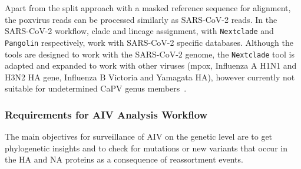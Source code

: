 Apart from the split approach with a masked reference sequence for alignment, the poxvirus reads can be processed similarly as \ac{SARS-CoV-2} reads. In the \ac{SARS-CoV-2} workflow, clade and lineage assignment, with \texttt{Nextclade} and \texttt{Pangolin} respectively, work with \ac{SARS-CoV-2} specific databases. Although the tools are designed to work with the \ac{SARS-CoV-2} genome, the \texttt{Nextclade} tool is adapted and expanded to work with other viruses (mpox, Influenza A H1N1 and H3N2 HA gene, Influenza B Victoria and Yamagata HA), however currently not suitable for undetermined \ac{CaPV} genus members~\cite{aksamentov2021nextclade}.

\subsubsection{Requirements for AIV Analysis Workflow}
The main objectives for surveillance of \ac{AIV} on the genetic level are to get phylogenetic insights and to check for mutations or new variants that occur in the \ac{HA} and \ac{NA} proteins as a consequence of reassortment events. \\

